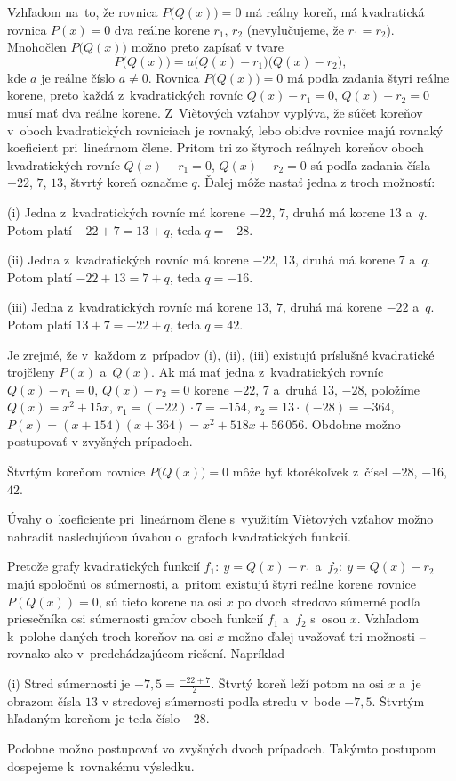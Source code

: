 ﻿{%
Vzhľadom na~to, že rovnica $P\bigl(Q(x)\bigr)=0$ má reálny koreň,
má kvadratická rovnica
$P(x)=0$ dva reálne korene
$r_1$, $r_2$ (nevylučujeme, že $r_1=r_2$).
Mnohočlen $P\bigl(Q(x)\bigr)$ možno preto zapísať v tvare
$$
P\bigl(Q(x)\bigr)=a\bigl(Q(x)-r_1\bigr)\bigl(Q(x)-r_2\bigr),
$$
kde $a$ je reálne číslo $a\ne0$.
Rovnica $P\bigl(Q(x)\bigr)=0$ má podľa zadania štyri reálne korene, preto
každá z~kvadratických rovníc $Q(x)-r_1=0$, $Q(x)-r_2=0$ musí mať
dva reálne
korene. Z~Vi\`etových vzťahov vyplýva, že súčet koreňov
v~oboch kvadratických rovniciach je rovnaký, lebo obidve rovnice majú
rovnaký koeficient
pri~lineárnom člene. Pritom tri zo štyroch
reálnych koreňov oboch kvadratických rovníc $Q(x)-r_1=0$, $Q(x)-r_2=0$
sú podľa zadania čísla $-22$, $7$,
$13$, štvrtý koreň označme $q$. Ďalej môže nastať jedna z troch možností:
\item{(i)} Jedna z~kvadratických
rovníc má korene $-22$, $7$, druhá má korene $13$ a~$q$. Potom
platí $-22+7=13+q$, teda $q=-28$.
\item{(ii)} Jedna z~kvadratických
rovníc má korene $-22$, $13$, druhá má korene $7$ a~$q$. Potom
platí $-22+13=7+q$, teda $q=-16$.
\item{(iii)} Jedna z~kvadratických
rovníc má korene $13$, $7$, druhá má korene $-22$ a~$q$. Potom
platí $13+7=-22+q$, teda $q=42$.

Je zrejmé, že v~každom z~prípadov (i), (ii), (iii) existujú príslušné
kvadratické trojčleny $P(x)$ a~$Q(x)$.
Ak má mať jedna z~kvadratických rovníc $Q(x)-r_1=0$,
$Q(x)-r_2=0$
korene $-22$, $7$ a~druhá $13$, $-28$, položíme $Q(x)=x^2+15 x$,
$r_1=(-22)\cdot7=-154$, $r_2=13\cdot(-28)=-364$,
$P(x)=(x+154)(x+364)=x^2+518 x+56\,056$. Obdobne možno postupovať v
zvyšných prípadoch.

Štvrtým koreňom rovnice $P\bigl(Q(x)\bigr)=0$ môže byť ktorékoľvek
z~čísel $-28$,
$-16$, $42$.

\ineriesenie
Úvahy o~koeficiente pri~lineárnom člene s~využitím Vi\`etových vzťahov možno
nahradiť nasledujúcou úvahou o~grafoch kvadratických funkcií.

Pretože grafy kvadratických funkcií $f_1\colon\ y=Q(x)-r_1$
a~$f_2\colon\ y=Q(x)-r_2$ majú spoločnú os súmernosti, a~pritom existujú štyri
reálne korene rovnice $P(Q(x))=0$, sú tieto korene na osi $x$ po dvoch
stredovo súmerné podľa priesečníka osi súmernosti grafov oboch funkcií
$f_1$ a~$f_2$ s~osou $x$.
Vzhľadom k~polohe daných troch
koreňov na osi $x$ možno ďalej uvažovať tri možnosti -- rovnako ako
v~predchádzajúcom riešení. Napríklad
\item{(i)} Stred súmernosti je $-7{,}5=\frac{-22+7}2$. Štvrtý
koreň leží potom na osi $x$ a~je obrazom čísla $13$ v stredovej
súmernosti podľa stredu v~bode $-7{,}5$. Štvrtým hľadaným koreňom
je teda číslo $-28$.

Podobne možno postupovať vo zvyšných dvoch prípadoch. Takýmto postupom
dospejeme k~rovnakému výsledku.
}

